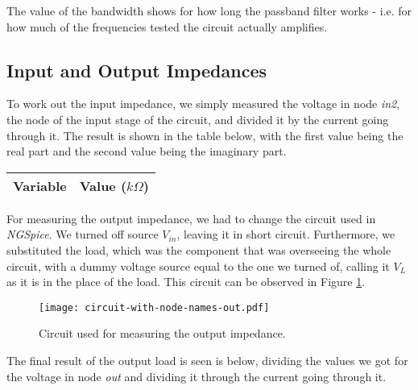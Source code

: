 \vspace{0.4cm}

The value of the bandwidth shows for how long the passband filter works - i.e. for how much of the frequencies tested the circuit actually amplifies.



\subsection{Input and Output Impedances}

To work out the input impedance, we simply measured the voltage in node \textit{in2}, the node of the input stage of the circuit, and divided it by the current going through it. The result is shown in the table below, with the first value being the real part and the second value being the imaginary part.

\vspace{0.4cm}

\begin{center}
\begin{tabular}{|l|r|}
  \hline    
  {\bf Variable} & {\bf Value ($k\Omega$)} \\ \hline
  
\end{tabular}
\end{center}

\vspace{0.4cm}

For measuring the output impedance, we had to change the circuit used in \textit{NGSpice}. We turned off source $V_{in}$, leaving it in short circuit. Furthermore, we substituted the load, which was the component that was overseeing the whole circuit, with a dummy voltage source equal to the one we turned of, calling it $V_L$ as it is in the place of the load. This circuit can be observed in Figure \ref{fig:circuit-2-spice}.

\vspace{0.4cm}


\begin{figure}[h] \centering
\texttt{[image: circuit-with-node-names-out.pdf]}
\caption{Circuit used for measuring the output impedance.}
\label{fig:circuit-2-spice}
\end{figure}

\vspace{0.4cm}

The final result of the output load is seen is below, dividing the values we got for the voltage in node \textit{out} and dividing it through the current going through it.

